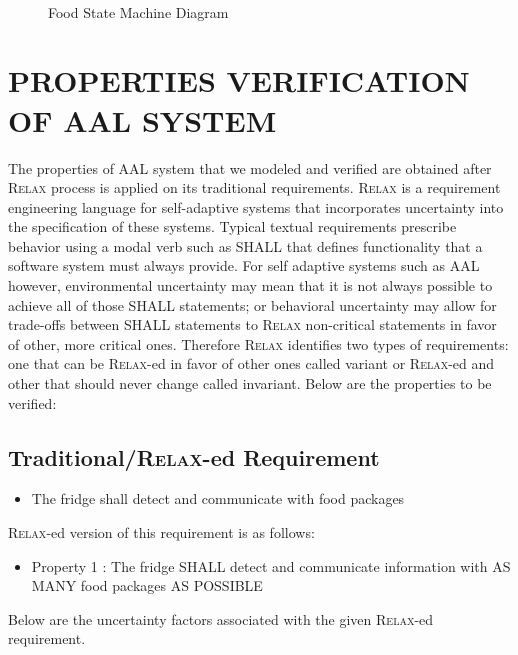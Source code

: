 \documentclass[a4paper,twoside]{article}
\def\myrelax{\textsc{Relax}}                  %
\begin{document}
\begin{figure}[!h]
  \vspace{8cm}~
  \centering
  {}
  \caption{Food State Machine Diagram}
  \label{fig:foodstm}
 \end{figure}

\section{\uppercase{Properties Verification of AAL system}}
\label{sec:properties}
The properties of AAL system that we modeled and verified are obtained after \myrelax{} process is applied on its traditional requirements. \myrelax{}  is  a  requirement  engineering language for self-adaptive systems that incorporates uncertainty into the specification of these systems. Typical  textual  requirements  prescribe behavior  using  a  modal  verb  such  as  SHALL  that defines  functionality  that  a  software  system  must always provide. For self adaptive systems such as AAL however, environmental  uncertainty  may  mean  that  it  is  not always  possible  to  achieve  all  of  those  SHALL statements; or behavioral uncertainty may allow for trade-offs between SHALL statements to \myrelax{} non-critical  statements  in  favor  of  other,  more  critical ones.  Therefore  \myrelax{}  identifies  two  types  of requirements:  one  that  can  be  \myrelax{}-ed  in  favor  of other ones called variant or \myrelax{}-ed and other that should never change called invariant.
Below are the properties to be verified: 

\subsection{Traditional/\myrelax{}-ed Requirement}

\begin{itemize}
\item The fridge shall detect and communicate with food packages
\end{itemize}

\myrelax{}-ed version of this requirement is as follows:

\begin{itemize}
\item Property 1 : The fridge SHALL detect and communicate information with AS MANY food packages AS POSSIBLE
\end{itemize}

Below are the uncertainty factors associated with the given \myrelax{}-ed requirement.
\end{document}
